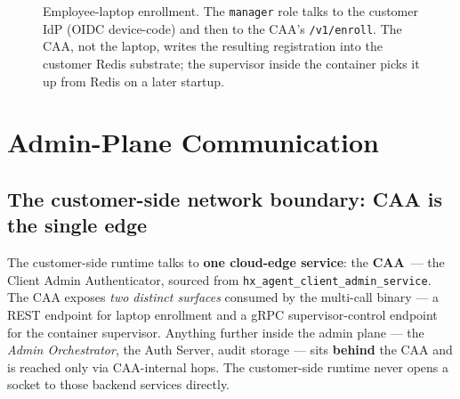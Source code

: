 \documentclass[11pt, a4paper]{article}
\newcommand{\code}[1]{\texttt{\small #1}}
\newcommand{\filepath}[1]{\textcolor{accentpurple}{\texttt{\small #1}}}
\begin{document}
\begin{figure}[h]
{
}
\caption{Employee-laptop enrollment. The \code{manager} role talks to the
customer IdP (OIDC device-code) and then to the CAA's \code{/v1/enroll}.
The CAA, not the laptop, writes the resulting registration into the
customer Redis substrate; the supervisor inside the container picks it
up from Redis on a later startup.}
\label{fig:laptop}
\end{figure}

\clearpage

\section{Admin-Plane Communication}\label{sec:admin-plane}

\subsection{The customer-side network boundary: CAA is the single edge}

The customer-side runtime talks to \textbf{one cloud-edge service}: the
\textbf{CAA}~--- the Client Admin Authenticator, sourced from
\filepath{hx\_agent\_\allowbreak client\_admin\_service}. The CAA exposes
\emph{two distinct surfaces} consumed by the multi-call binary --- a REST
endpoint for laptop enrollment and a gRPC supervisor-control endpoint for
the container supervisor. Anything further inside the admin plane --- the
\emph{Admin Orchestrator}, the Auth Server, audit storage --- sits
\textbf{behind} the CAA and is reached only via CAA-internal hops. The
customer-side runtime never opens a socket to those backend services
directly.
\end{document}
